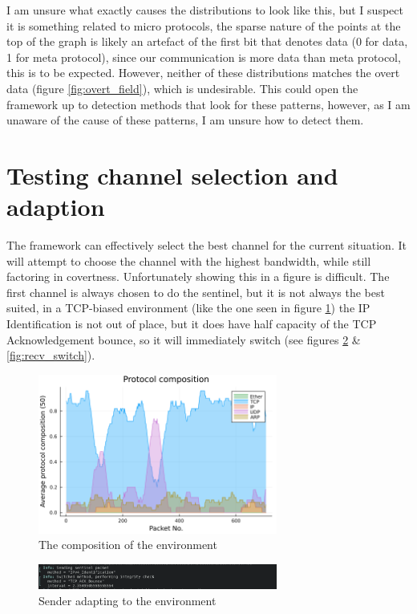 I am unsure what exactly causes the distributions to look like this, but I suspect it is something related to micro protocols, the sparse nature of the points at the top of the graph is likely an artefact of the first bit that denotes data (0 for data, 1 for meta protocol), since our communication is more data than meta protocol, this is to be expected. However, neither of these distributions matches the overt data (figure \ref{fig:overt_field}), which is undesirable. This could open the framework up to detection methods that look for these patterns, however, as I am unaware of the cause of these patterns, I am unsure how to detect them.

\section{Testing channel selection and adaption}

The framework can effectively select the best channel for the current situation. It will attempt to choose the channel with the highest bandwidth, while still factoring in covertness. Unfortunately showing this in a figure is difficult. The first channel is always chosen to do the sentinel, but it is not always the best suited, in a TCP-biased environment (like the one seen in figure \ref{fig:env_composition}) the IP Identification is not out of place, but it does have half capacity of the TCP Acknowledgement bounce, so it will immediately switch (see figures \ref{fig:send_switch} \& \ref{fig:recv_switch}).

\begin{figure}[h]
    \centering
    \includegraphics[width=0.7\textwidth]{fig/environment_composition.png}
    \caption{The composition of the environment}
    \label{fig:env_composition}
\end{figure}

\begin{figure}[h]
    \centering
    \includegraphics[width=0.7\textwidth]{fig/sender_adapt.png}
    \caption{Sender adapting to the environment}
    \label{fig:send_switch}
\end{figure}

